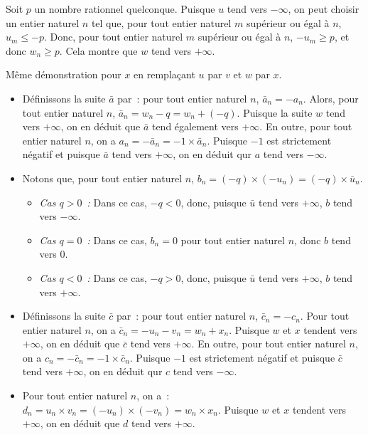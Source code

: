     Soit $p$ un nombre rationnel quelconque.
    Puisque $u$ tend vers $-\infty$, on peut choisir un entier naturel $n$ tel que, pour tout entier naturel $m$ supérieur ou égal à $n$, $u_m \leq -p$. 
    Donc, pour tout entier naturel $m$ supérieur ou égal à $n$, $- u_m \geq p$, et donc $w_n \geq p$.
    Cela montre que $w$ tend vers $+\infty$.

    Même démonstration pour $x$ en remplaçant $u$ par $v$ et $w$ par $x$.

    \begin{itemize}[nosep]
        \item Définissons la suite $\bar{a}$ par : pour tout entier naturel $n$, $\bar{a}_n = - a_n$.
            Alors, pour tout entier naturel $n$, $\bar{a}_n = w_n - q = w_n + (-q)$.
            Puisque la suite $w$ tend vers $+\infty$, on en déduit que $\bar{a}$ tend également vers $+\infty$.
            En outre, pour tout entier naturel $n$, on a $a_n = - \bar{a}_n = -1 \times \bar{a}_n$.
            Puisque $-1$ est strictement négatif et puisque $\bar{a}$ tend vers $+\infty$, on en déduit qur $a$ tend vers $-\infty$.
        \item Notons que, pour tout entier naturel $n$, $b_n = (-q) \times (-u_n) = (-q) \times \bar{u}_n$. 
            \begin{itemize}[nosep]
                \item \emph{Cas $q > 0$ :} Dans ce cas, $-q < 0$, donc, puisque $\bar{u}$ tend vers $+\infty$, $b$ tend vers $-\infty$.
                \item \emph{Cas $q = 0$ :} Dans ce cas, $b_n = 0$ pour tout entier naturel $n$, donc $b$ tend vers $0$.
                \item \emph{Cas $q < 0$ :} Dans ce cas, $-q > 0$, donc, puisque $\bar{u}$ tend vers $+\infty$, $b$ tend vers $+\infty$.
            \end{itemize}
        \item Définissons la suite $\bar{c}$ par : pour tout entier naturel $n$, $\bar{c}_n = - c_n$.
            Pour tout entier naturel $n$, on a $\bar{c}_n = -u_n - v_n = w_n + x_n$.
            Puisque $w$ et $x$ tendent vers $+\infty$, on en déduit que $\bar{c}$ tend vers $+\infty$.
            En outre, pour tout entier naturel $n$, on a $c_n = - \bar{c}_n = -1 \times \bar{c}_n$.
            Puisque $-1$ est strictement négatif et puisque $\bar{c}$ tend vers $+\infty$, on en déduit qur $c$ tend vers $-\infty$.
        \item Pour tout entier naturel $n$, on a : $d_n = u_n \times v_n = (- u_n) \times (- v_n) = w_n \times x_n$.
            Puisque $w$ et $x$ tendent vers $+\infty$, on en déduit que $d$ tend vers $+\infty$.
    \end{itemize}

